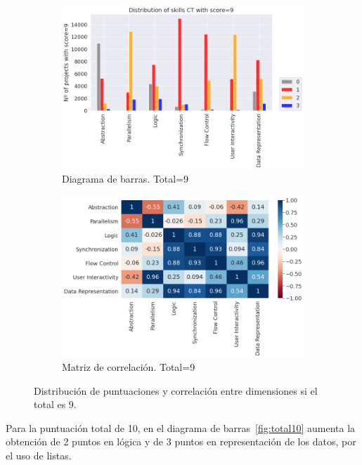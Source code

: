 \documentclass[a4paper, 12pt]{book}
\begin{document}
\begin{figure}
    \centering
    \begin{subfigure}[h]{.49\textwidth} 
        \includegraphics[width=\textwidth]{img/distribucion_9_Scratch}
        \caption{Diagrama de barras. Total=9}
        \label{fig:total9}
    \end{subfigure}       
    \begin{subfigure}[h]{.49\textwidth} 
        \includegraphics[width=\textwidth]{img/corr_9_Scratch}
        \caption{Matriz de correlación. Total=9}
        \label{fig:corr9}
    \end{subfigure}
     \caption{Distribución de puntuaciones y correlación entre dimensiones si el total es 9.}
\end{figure}

Para la puntuación total de 10, en el diagrama de barras~\ref{fig:total10} aumenta la obtención de 2 puntos en lógica y de 3 puntos en representación de los datos, por el uso de listas. 
\end{document}
